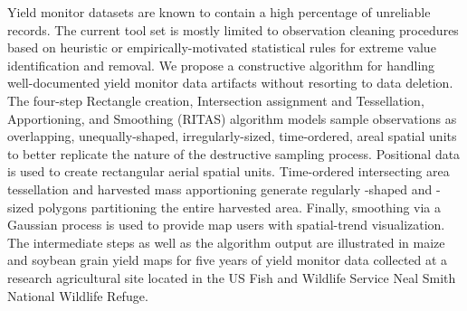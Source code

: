 
Yield monitor datasets are known to contain a high percentage of
unreliable records. The current tool set is mostly limited to
observation cleaning procedures based on heuristic or
empirically-motivated statistical rules for extreme value
identification and removal. We propose a constructive algorithm for
handling well-documented yield monitor data artifacts without
resorting to data deletion. The four-step Rectangle creation,
Intersection assignment and Tessellation, Apportioning, and Smoothing
(RITAS) algorithm models sample observations as overlapping,
unequally-shaped, irregularly-sized, time-ordered, areal spatial units
to better replicate the nature of the destructive sampling
process. Positional data is used to create rectangular aerial spatial
units. Time-ordered intersecting area tessellation and harvested mass
apportioning generate regularly -shaped and \mbox{-sized} polygons
partitioning the entire harvested area. Finally, smoothing via a
Gaussian process is used to provide map users with spatial-trend
visualization. The intermediate steps as well as the algorithm output
are illustrated in maize and soybean grain yield maps for five years
of yield monitor data collected at a research agricultural site
located in the US Fish and Wildlife Service Neal Smith National
Wildlife Refuge.

